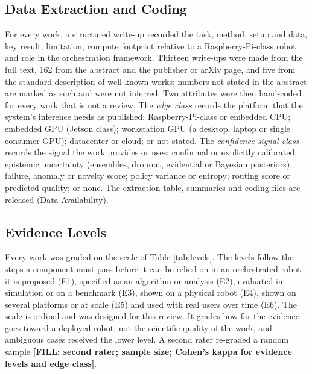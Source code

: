 \documentclass[journal]{IEEEtran}
\newcommand{\fillin}[1]{{\color{red}\bfseries [FILL: #1]}}
\begin{document}
\subsection{Data Extraction and Coding}\label{sec:extraction}
For every work, a structured write-up recorded the task, method, setup and data, key result, limitation, compute footprint relative to a Raspberry-Pi-class robot and role in the orchestration framework. Thirteen write-ups were made from the full text, 162 from the abstract and the publisher or arXiv page, and five from the standard description of well-known works; numbers not stated in the abstract are marked as such and were not inferred. Two attributes were then hand-coded for every work that is not a review. The \emph{edge class} records the platform that the system's inference needs as published: Raspberry-Pi-class or embedded CPU; embedded GPU (Jetson class); workstation GPU (a desktop, laptop or single consumer GPU); datacenter or cloud; or not stated. The \emph{confidence-signal class} records the signal the work provides or uses: conformal or explicitly calibrated; epistemic uncertainty (ensembles, dropout, evidential or Bayesian posteriors); failure, anomaly or novelty score; policy variance or entropy; routing score or predicted quality; or none. The extraction table, summaries and coding files are released (Data Availability).

\subsection{Evidence Levels}\label{sec:levels}
Every work was graded on the scale of Table \ref{tab:levels}. The levels follow the steps a component must pass before it can be relied on in an orchestrated robot: it is proposed (E1), specified as an algorithm or analysis (E2), evaluated in simulation or on a benchmark (E3), shown on a physical robot (E4), shown on several platforms or at scale (E5) and used with real users over time (E6). The scale is ordinal and was designed for this review. It grades how far the evidence goes toward a deployed robot, not the scientific quality of the work, and ambiguous cases received the lower level. A second rater re-graded a random sample \fillin{second rater; sample size; Cohen's kappa for evidence levels and edge class}.
\end{document}
